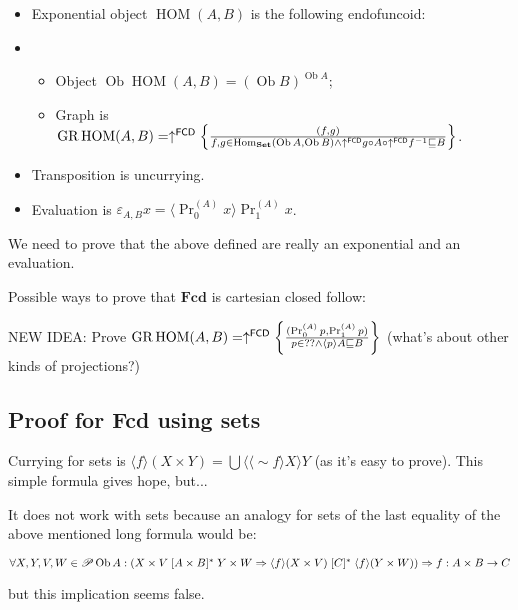 \begin{itemize}
\item Exponential object $\operatorname{HOM}(A,B)$ is the following endofuncoid:
\item\begin{itemize}
\item Object $\operatorname{Ob}\operatorname{HOM}(A,B) = (\operatorname{Ob} B)^{\operatorname{Ob} A}$;
\item Graph is $\operatorname{GR} \operatorname{HOM} ( A , B) = \uparrow^{\mathsf{FCD}} \left\{ \frac{ ( f , g) }{ f, g \in \operatorname{Hom}_{\mathbf{Set}} (\operatorname{Ob} A,\operatorname{Ob} B) \wedge \uparrow^{\mathsf{FCD}}g \circ A \circ \uparrow^{\mathsf{FCD}}f^{- 1} \sqsubseteq B }\right\}$.
\end{itemize}
\item Transposition is uncurrying.
\item Evaluation is $\varepsilon_{A, B} x = \langle \operatorname{Pr}^{(A)}_0 x \rangle \operatorname{Pr}^{(A)}_1 x$.
\end{itemize}

We need to prove that the above defined are really an exponential and an evaluation.

Possible ways to prove that $\mathbf{Fcd}$ is cartesian closed follow:

NEW IDEA: Prove $\operatorname{GR}\operatorname{HOM}(A,B) =
\uparrow^{\mathsf{FCD}}\left\{ \frac{(\Pr^{(A)}_0 p,\Pr^{(A)}_1 p)}{
p\in??\land\left\langle p\right\rangle A\sqsubseteq B}\right\}$ (what's about other
kinds of projections?)

\subsection{Proof for Fcd using sets}

Currying for sets is $\langle f \rangle ( X \times Y) = \bigcup \langle \langle \sim f \rangle X
\rangle Y$ (as it's easy to prove). This simple formula gives hope, but...

It does not work with sets because an analogy for sets of the last equality of the above mentioned long formula would be:

$\forall X, Y, V, W \in \mathscr{P} \operatorname{Ob} A : \left( X \times V \mathrel{[
A \times B]^{\ast}} Y \times W \Rightarrow \langle f \rangle ( X \times V)
\mathrel{[ C]^{\ast}} \langle f \rangle ( Y \times W) \right) \Rightarrow \\ f : A
\times B \rightarrow C$

but this implication seems false.

